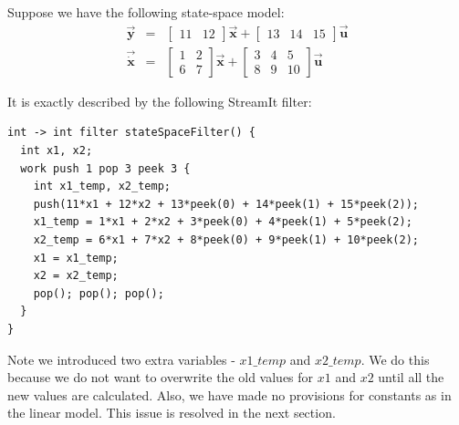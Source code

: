     Suppose we have the following state-space model:
\begin{eqnarray*}
\vec{\mathbf{y}} & = & \left [ \begin{array} {cc} 11 & 12
\end{array} \right ] \vec{\mathbf{x}} + \left [ \begin{array} {ccc} 13 & 14 & 15 \end{array} \right
 ] \vec{\mathbf{u}} \\
\vec{\dot{\mathbf{x}}} & = & \left [ \begin{array} {cc} 1 & 2 \\ 6
& 7 \end{array} \right ] \vec{\mathbf{x}} + \left [ \begin{array} {ccc} 3 & 4 & 5 \\
8 & 9 & 10 \end{array} \right ] \vec{\mathbf{u}}
\end{eqnarray*}

    It is exactly described by the following StreamIt filter:
\begin{scriptsize}
\begin{singlespace}
\begin{verbatim}
int -> int filter stateSpaceFilter() {
  int x1, x2;
  work push 1 pop 3 peek 3 {
    int x1_temp, x2_temp;
    push(11*x1 + 12*x2 + 13*peek(0) + 14*peek(1) + 15*peek(2));
    x1_temp = 1*x1 + 2*x2 + 3*peek(0) + 4*peek(1) + 5*peek(2);
    x2_temp = 6*x1 + 7*x2 + 8*peek(0) + 9*peek(1) + 10*peek(2);
    x1 = x1_temp;
    x2 = x2_temp;
    pop(); pop(); pop();
  }
}
\end{verbatim}
\end{singlespace}
\end{scriptsize}

    Note we introduced two extra variables - $x1\_temp$ and $x2\_temp$.
We do this because we do not want to overwrite the old values for
$x1$ and $x2$ until all the new values are calculated. Also, we
have made no provisions for constants as in the linear model. This
issue is resolved in the next section.
